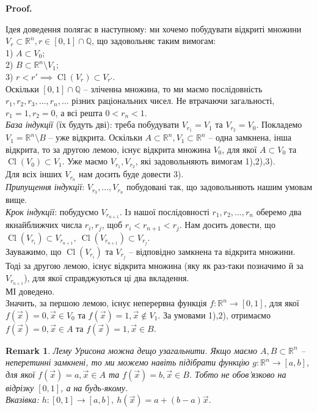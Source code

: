 \documentclass[a4paper, 10pt]{article}
\makeatletter
\def\qed{$\blacksquare$}
\theoremstyle{theoremdd}
\theoremstyle{theoremdd}
\theoremstyle{theoremdd}
\theoremstyle{theoremdd}
\theoremstyle{theoremdd}
\theoremstyle{theoremdd}
\newtheorem{remark}[theorem]{Remark}
\theoremstyle{theoremdd}
\theoremstyle{theoremdd}
\renewenvironment{proof}[1][Proof.\\]{\par
\pushQED{\hfill \qed}%
\normalfont \topsep6\p@\@plus6\p@\relax
\trivlist
\item\relax
{\bfseries
#1\@addpunct{.}}\hspace\labelsep\ignorespaces
}{%
\popQED\endtrivlist\@endpefalse
}
\DeclareMathOperator{\Cl}{Cl}
\makeatother
\begin{document}
\begin{proof}
Ідея доведення полягає в наступному: ми хочемо побудувати відкриті множини $V_r \subset \mathbb{R}^n, r \in [0,1] \cap \mathbb{Q}$, що задовольняє таким вимогам:\\
1) $A \subset V_0$;\\
2) $B \subset \mathbb{R}^n \setminus V_1$;\\
3) $r < r' \implies \Cl(V_r) \subset V_{r'}$.\\
Оскільки $[0,1] \cap \mathbb{Q}$ -- зліченна множина, то ми маємо послідовність $r_1,r_2,r_3,\dots,r_n,\dots$ різних раціональних чисел. Не втрачаючи загальності, $r_1 = 1, r_2 = 0$, а всі решта $0 < r_n < 1$.\\
\textit{База індукції} (їх будуть дві): треба побудувати $V_{r_1} = V_1$ та $V_{r_2} = V_0$. Покладемо $V_1 = \mathbb{R}^n \setminus B$ -- уже відкрита. Оскільки $A \subset \mathbb{R}^n, V_1 \subset \mathbb{R}^n$ -- одна замкнена, інша відкрита, то за другою лемою, існує відкрита множина $V_0$, для якої $A \subset V_0$ та $\Cl(V_0) \subset V_1$. Уже маємо $V_{r_1},V_{r_2}$, які задовольняють вимогам 1),2),3).\\
Для всіх інших $V_{r_n}$ нам досить буде довести 3).\\
\textit{Припущення індукції}: $V_{r_3},\dots,V_{r_n}$ побудовані так, що задовольняють нашим умовам вище.\\
\textit{Крок індукції}: побудуємо $V_{r_{n+1}}$. Із нашої послідовності $r_1,r_2,\dots,r_n$ оберемо два якнайближчих числа $r_i,r_j$, щоб $r_i < r_{n+1} < r_j$. Нам досить довести, що $\Cl(V_{r_i}) \subset V_{r_{n+1}},\ \Cl(V_{r_{n+1}}) \subset V_{r_j}$.\\
Зауважимо, що $\Cl(V_{r_i})$ та $V_{r_j}$ -- відповідно замкнена та відкрита множини. Тоді за другою лемою, існує відкрита множина (яку як раз-таки позначимо й за $V_{r_{n+1}}$), для якої справджуються ці два вкладення. \\
МІ доведено.\\
Значить, за першою лемою, існує неперервна функція $f \colon \mathbb{R}^n \to [0,1]$, для якої $f(\vec{x}) = 0, \vec{x} \in V_0$ та $f(\vec{x}) = 1, \vec{x} \notin V_1$. За умовами 1),2), отримаємо $f(\vec{x}) = 0, \vec{x} \in A$ та $f(\vec{x}) = 1, \vec{x} \in B$.
\end{proof}

\begin{remark}
Лему Урисона можна дещо узагальнити. Якщо маємо $A,B \subset \mathbb{R}^n$ -- неперетинні замкнені, то ми можемо навіть підібрати функцію $g \colon \mathbb{R}^n \to [a,b]$, для якої $f(\vec{x}) = a, \vec{x} \in A$ та $f(\vec{x}) = b, \vec{x} \in B$. Тобто не обов'язково на відрізку $[0,1]$, а на будь-якому.\\
\textit{Вказівка: $h \colon [0,1] \to [a,b],\ h(\vec{x}) = a + (b-a)\vec{x}$.}
\end{remark}
\end{document}
